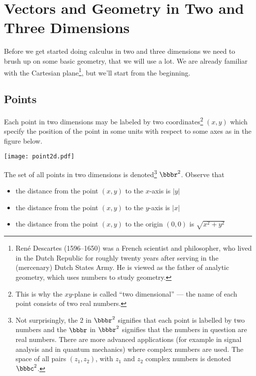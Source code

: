 

\graphicspath{{figs_geometry/}}
\chapter{Vectors and Geometry in Two and Three Dimensions}\label{chap geometry}

Before we get started doing calculus in two and three dimensions 
we need to brush up on some basic geometry, that we will use a lot. 
We are already familiar with the Cartesian plane\footnote{Ren\'e Descartes
(1596--1650) was a French scientist and philosopher, who lived in the Dutch Republic for roughly twenty years after serving in the (mercenary) Dutch States Army.
He is viewed as the father of analytic geometry, which uses numbers
to study geometry.},  but we'll start from the beginning.

\section{Points}\label{sec points}

Each point in two dimensions may be labeled by two coordinates\footnote{This is why the $xy$-plane is called ``two dimensional'' --- the name of each point consists of two real numbers.}
$(x,y)$ which specify the position of the point in some units with respect
to some axes as in the figure below. 
\begin{efig}
\begin{center}
   \texttt{[image: point2d.pdf]}
\end{center}
\end{efig}
The set of all points in two dimensions is denoted\footnote{Not surprisingly,
the $2$ in $\bbbr^2$ signifies that each point is labelled by two numbers
and the $\bbbr$ in $\bbbr^2$ signifies that the numbers in question are
real numbers. There are more advanced applications (for example in
signal analysis and in quantum mechanics) where complex numbers are used.
The space of all pairs $(z_1,z_2)$, with $z_1$ and $z_2$ complex numbers 
is denoted  $\bbbc^2$.} $\bbbr^2$.
Observe that 
\begin{itemize}\itemsep1pt \parskip0pt 
\item the distance from the point $(x,y)$ to the $x$-axis is $|y|$
\item the distance from the point $(x,y)$ to the $y$-axis is $|x|$
\item the distance from the point $(x,y)$ to the origin $(0,0)$ is 
     $\sqrt{x^2+y^2}$
\end{itemize}

